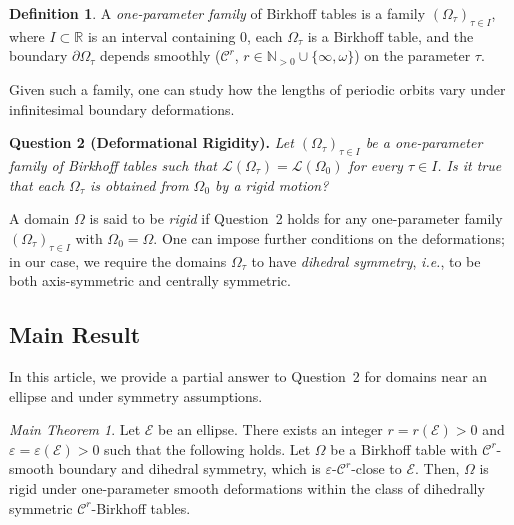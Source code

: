 \documentclass[12pt, openany]{amsart}
\theoremstyle{definition}
\newtheorem{definition}[theorem]{Definition}
\theoremstyle{remark}
\theoremstyle{remark}
\theoremstyle{theorem}
\theoremstyle{theorem}
\theoremstyle{theorem}
\theoremstyle{theorem}
\newtheorem*{mainthm}{Main Theorem}
\begin{document}
\begin{definition}
    A \emph{one-parameter family} of Birkhoff tables is a family $(\Omega_{\tau})_{\tau \in I}$, where $I \subset \mathbb{R}$ is an interval containing $0$, each $\Omega_{\tau}$ is a Birkhoff table, and the boundary $\partial\Omega_{\tau}$ depends smoothly ($\mathscr{C}^r$, $r \in \mathbb{N}_{>0} \cup \{\infty, \omega\}$) on the parameter $\tau$.
\end{definition}



Given such a family, one can study how the lengths of periodic orbits vary under infinitesimal boundary deformations.

\medskip
\textbf{Question 2 (Deformational Rigidity).} \textit{Let $(\Omega_{\tau})_{\tau \in I}$ be a one-parameter family of Birkhoff tables such that $\mathscr{L}(\Omega_\tau) = \mathscr{L}(\Omega_0)$ for every $\tau \in I$. Is it true that each $\Omega_{\tau}$ is obtained from $\Omega_0$ by a rigid motion?}

A domain $\Omega$ is said to be \emph{rigid} if Question~2 holds for any one-parameter family $(\Omega_{\tau})_{\tau \in I}$ with $\Omega_0 = \Omega$. One can impose further conditions on the deformations; in our case, we require the domains $\Omega_{\tau}$ to have \emph{dihedral symmetry}, {\it i.e.}, to be both axis-symmetric and centrally symmetric.



\subsection{Main Result}

In this article, we provide a partial answer to Question~2 for domains near an ellipse and under symmetry assumptions.

\begin{mainthm}\label{theorem:main}
    Let $\mathscr{E}$ be an ellipse. There exists an integer $r = r(\mathscr{E}) > 0$ and $\varepsilon = \varepsilon(\mathscr{E}) > 0$ such that the following holds. Let $\Omega$ be a Birkhoff table with $\mathscr{C}^{r}$-smooth boundary and dihedral symmetry, which is $\varepsilon$-$\mathscr{C}^r$-close to $\mathscr{E}$. Then, $\Omega$ is rigid under one-parameter smooth deformations within the class of dihedrally symmetric $\mathscr{C}^r$-Birkhoff tables.
\end{mainthm}
\end{document}
